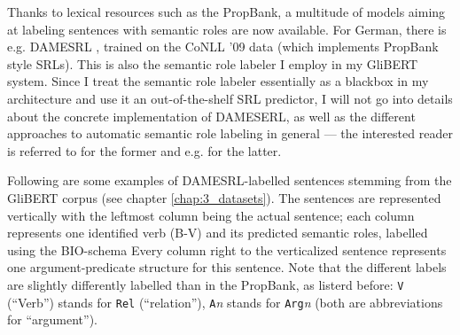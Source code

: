 


Thanks to lexical resources such as the PropBank, a multitude of models
aiming at labeling sentences with semantic roles are now available. For
German, there is e.g. DAMESRL \citep{do2018flexible}, trained on the CoNLL
'09 \citep{hajivc2009conll} data (which implements PropBank style SRLs).
This is also the semantic role labeler I employ in my GliBERT system.
Since I treat the semantic role labeler essentially as a blackbox in my
architecture and use it an out-of-the-shelf SRL predictor, I will not go
into details about the concrete implementation of DAMESERL, as well as the
different approaches to automatic semantic role labeling in general ---
the interested reader is referred to \cite{do2018flexible} for the former
and e.g. \cite{palmer2010semantic} for the latter.

Following are some examples of DAMESRL-labelled sentences stemming from the GliBERT corpus (see
chapter \ref{chap:3_datasets}). The sentences are represented vertically with the leftmost column
being the actual sentence; each column represents one identified verb (B-V) and its predicted
semantic roles, labelled using the BIO-schema Every column
right to the verticalized sentence represents one argument-predicate structure for this sentence.
Note that the different labels are slightly differently labelled than in the PropBank, as listerd
before: \texttt{V} (``Verb'') stands for \texttt{Rel} (``relation''), \texttt{A}\textit{n} stands
for \texttt{Arg}\textit{n} (both are abbreviations for ``argument'').

